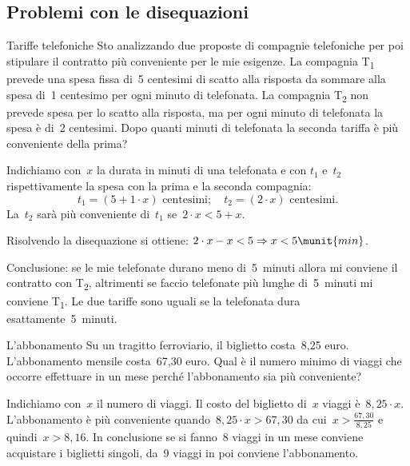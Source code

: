 
\subsection{Problemi con le disequazioni}
\label{sec:dis_problemi}

\begin{problema}{Tariffe telefoniche}{}
Sto analizzando due proposte di compagnie telefoniche per poi stipulare
il contratto più conveniente per le mie esigenze. La compagnia
T\textsubscript{1} prevede una spesa fissa di~5 centesimi di scatto
alla risposta da sommare alla spesa di~1 centesimo per ogni minuto di
telefonata. La compagnia T\textsubscript{2} non prevede spesa per lo
scatto alla risposta, ma per ogni minuto di telefonata la spesa è di~2 
centesimi.
Dopo quanti minuti di telefonata la seconda tariffa è
più conveniente della prima?
\end{problema}

\begin{soluzione}
Indichiamo con~\(x\) la durata in minuti di una telefonata e con
\(t_{1}\) e~\(t_{2}\) rispettivamente la spesa con
la prima e la seconda compagnia:
\[t_{1}=(5+1\cdot x)\text{ centesimi};\quad t_{2}=(2\cdot x)\text{ 
centesimi.}\]
La~\(t_2\) sarà più conveniente di~\(t_1\) se~\(2\cdot x<5+x\).

Risolvendo la disequazione si ottiene:
\(2\cdot x-x<5\Rightarrow x<5\munit{min}\).

Conclusione: se le mie telefonate durano meno di~5~minuti allora mi
conviene il contratto con T\textsubscript{2}, altrimenti se faccio
telefonate più lunghe di~5~minuti mi conviene T\textsubscript{1}. Le
due tariffe sono uguali se la telefonata dura esattamente~5~minuti.
\end{soluzione}

\begin{problema}{L'abbonamento}{}
Su un tragitto ferroviario, il biglietto costa~8,25 euro.
L'abbonamento mensile costa~67,30 euro. Qual è il
numero minimo di viaggi che occorre effettuare in un mese perché
l'abbonamento sia più conveniente?
\end{problema}

\begin{soluzione}{}{}
Indichiamo con~\(x\) il numero di viaggi. Il costo del biglietto di~\(x\) 
viaggi è~\(8,25\cdot x\). L'abbonamento è più
conveniente quando~\(8,25\cdot x>67,30\) da cui~\(x>\frac{67,30}{8,25}\)
e quindi~\(x>8,16\). In conclusione se si fanno~8 viaggi in un
mese conviene acquistare i biglietti singoli, da~9 viaggi in poi
conviene l'abbonamento.
\end{soluzione}

